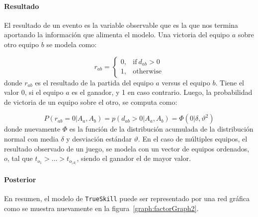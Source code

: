 \documentclass[11pt,twoside,spanish]{report} %
\begin{document}
\paragraph{Resultado}

El resultado de un evento es la variable observable que es la que nos termina aportando la informaci\'on que alimenta el modelo.
Una victoria del equipo $a$ sobre otro equipo $b$ se modela como:

\begin{equation}
	r_{ab} =
	\begin{cases}
		0, & \text{if}\ d_{ab} > 0 \\
		1, & \text{otherwise}
	\end{cases}
\end{equation}
donde $r_{ab}$ es el resultado de la partida del equipo $a$ versus el equipo $b$.
Tiene el valor 0, si el equipo $a$ es el ganador, y 1 en caso contrario.
Luego, la probabilidad de victoria de un equipo sobre el otro, se computa como:

\begin{equation} \label{eq:proba_win}
P(r_{ab}=0|A_a,A_b) = p(d_{ab} > 0 | A_a,A_b) =  \Phi\left( 0| \delta, \vartheta^2 \right)
\end{equation}
donde nuevamente $\Phi$ es la funci\'on de la distribuci\'on acumulada de la distribuci\'on normal con media $\delta$ y desviaci\'on est\'andar $\vartheta$.
En el caso de m\'ultiples equipos, el resultado observado de un juego, se modela con un vector de equipos ordenados, $o$, tal que $t_{o_1}> \dots > t_{o_{|A|}}$, siendo el ganador el de mayor valor.

\paragraph{Posterior} En resumen, el modelo de \texttt{TrueSkill} puede ser representado por una red gr\'afica como se muestra nuevamente en la figura~\ref{graph:factorGraph2}.
\end{document}
